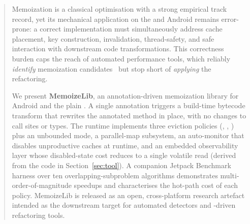 \begin{abstract}

Memoization is a classical optimisation with a strong empirical track record, yet its mechanical application on the \jvm and Android remains error-prone: a correct implementation must simultaneously address cache placement, key construction, invalidation, thread-safety, and safe interaction with downstream code transformations. This correctness burden caps the reach of automated performance tools, which reliably \emph{identify} memoization candidates~\cite{immutator} but stop short of \emph{applying} the refactoring.

We present \textbf{MemoizeLib}, an annotation-driven memoization library for Android and the plain \jvm. A single  annotation triggers a build-time bytecode transform that rewrites the annotated method in place, with no changes to call sites or types. The runtime implements three eviction policies (\lru, \fifo, \lfu) plus an unbounded mode, a parallel-map \ttl subsystem, an auto-monitor that disables unproductive caches at runtime, and an embedded observability layer whose disabled-state cost reduces to a single volatile read (derived from the code in Section~\ref{sec:tool}). A companion Jetpack Benchmark harness over ten overlapping-subproblem algorithms demonstrates multi-order-of-magnitude speedups and characterises the hot-path cost of each policy. MemoizeLib is released as an open, cross-platform research artefact intended as the downstream target for automated detectors and \llm-driven refactoring tools.

\end{abstract}
